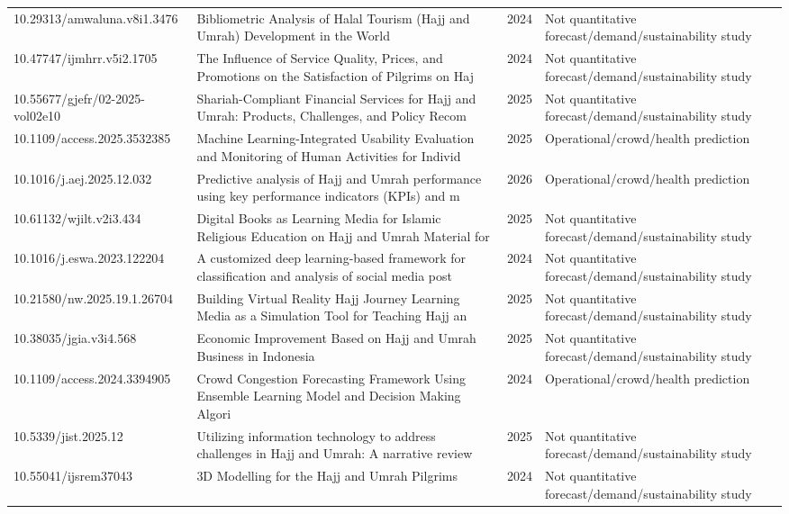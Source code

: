 \begin{longtable}{@{}p{3.6cm}p{7.3cm}p{0.8cm}p{3.4cm}@{}}
10.29313/amwaluna.v8i1.3476 & Bibliometric Analysis of Halal Tourism (Hajj and Umrah) Development in the World & 2024 & Not quantitative forecast/demand/sustainability study \\
10.47747/ijmhrr.v5i2.1705 & The Influence of Service Quality, Prices, and Promotions on the Satisfaction of Pilgrims on Haj & 2024 & Not quantitative forecast/demand/sustainability study \\
10.55677/gjefr/02-2025-vol02e10 & Shariah-Compliant Financial Services for Hajj and Umrah: Products, Challenges, and Policy Recom & 2025 & Not quantitative forecast/demand/sustainability study \\
10.1109/access.2025.3532385 & Machine Learning-Integrated Usability Evaluation and Monitoring of Human Activities for Individ & 2025 & Operational/crowd/health prediction \\
10.1016/j.aej.2025.12.032 & Predictive analysis of Hajj and Umrah performance using key performance indicators (KPIs) and m & 2026 & Operational/crowd/health prediction \\
10.61132/wjilt.v2i3.434 & Digital Books as Learning Media for Islamic Religious Education on Hajj and Umrah Material for  & 2025 & Not quantitative forecast/demand/sustainability study \\
10.1016/j.eswa.2023.122204 & A customized deep learning-based framework for classification and analysis of social media post & 2024 & Not quantitative forecast/demand/sustainability study \\
10.21580/nw.2025.19.1.26704 & Building Virtual Reality Hajj Journey Learning Media  as a Simulation Tool for Teaching Hajj an & 2025 & Not quantitative forecast/demand/sustainability study \\
10.38035/jgia.v3i4.568 & Economic Improvement Based on Hajj and Umrah Business in Indonesia & 2025 & Not quantitative forecast/demand/sustainability study \\
10.1109/access.2024.3394905 & Crowd Congestion Forecasting Framework Using Ensemble Learning Model and Decision Making Algori & 2024 & Operational/crowd/health prediction \\
10.5339/jist.2025.12 & Utilizing information technology to address challenges in Hajj and Umrah: A narrative review & 2025 & Not quantitative forecast/demand/sustainability study \\
10.55041/ijsrem37043 & 3D Modelling for the Hajj and Umrah Pilgrims & 2024 & Not quantitative forecast/demand/sustainability study \\

\end{longtable}
